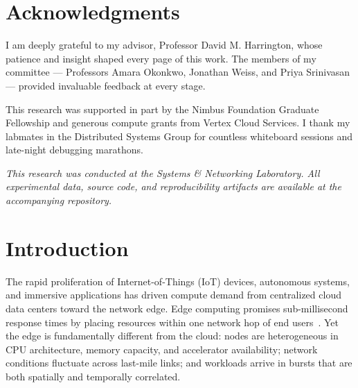 \documentclass[12pt,oneside]{book}
\begin{document}
\chapter*{Acknowledgments}

I am deeply grateful to my advisor, Professor David M. Harrington, whose
patience and insight shaped every page of this work. The members of my
committee --- Professors Amara Okonkwo, Jonathan Weiss, and Priya Srinivasan ---
provided invaluable feedback at every stage.

This research was supported in part by the Nimbus Foundation Graduate
Fellowship and generous compute grants from Vertex Cloud Services. I thank my
labmates in the Distributed Systems Group for countless whiteboard sessions and
late-night debugging marathons.

\vspace{1.5em}
\noindent
\begin{minipage}{0.85\textwidth}
\singlespacing
\begin{tcolorbox}[
  colback=uclagold!8,
  colframe=uclagold!40,
  boxrule=0.5pt,
  arc=2pt,
  left=8pt,
  right=8pt,
  top=6pt,
  bottom=6pt
]
\footnotesize\itshape\color{ucladark}
\textbf{\faUniversity}\quad This research was conducted at the
Systems \& Networking Laboratory. All experimental data, source code, and
reproducibility artifacts are available at the accompanying repository.
\end{tcolorbox}
\end{minipage}

\chapter{Introduction}
\label{ch:intro}

The rapid proliferation of Internet-of-Things (IoT) devices, autonomous
systems, and immersive applications has driven compute demand from centralized
cloud data centers toward the network edge. Edge computing promises
sub-millisecond response times by placing resources within one network hop of
end users~\cite{satyanarayanan2017emergence}. Yet the edge is fundamentally
different from the cloud: nodes are heterogeneous in CPU architecture, memory
capacity, and accelerator availability; network conditions fluctuate across
last-mile links; and workloads arrive in bursts that are both spatially and
temporally correlated.
\end{document}
